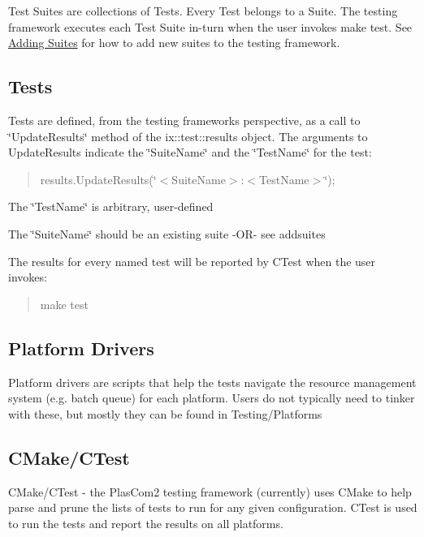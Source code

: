 Test Suites are collections of Tests. Every Test belongs to a Suite. The testing framework executes each Test Suite in-\/turn when the user invokes \textquotesingle{}make test\textquotesingle{}. See \hyperlink{testing_reference_addsuite}{Adding Suites} for how to add new suites to the testing framework.\hypertarget{testing_reference_tests}{}\subsection{Tests}\label{testing_reference_tests}
Tests are defined, from the testing framework\textquotesingle{}s perspective, as a call to \char`\"{}\+Update\+Results\char`\"{} method of the ix\+::test\+::results object. The arguments to Update\+Results indicate the \char`\"{}\+Suite\+Name\char`\"{} and the \char`\"{}\+Test\+Name\char`\"{} for the test\+:

\begin{quote}
results.\+Update\+Results(\char`\"{}$<$\+Suite\+Name$>$\+:$<$\+Test\+Name$>$\char`\"{}); \end{quote}



\begin{DoxyItemize}
\item The \char`\"{}\+Test\+Name\char`\"{} is arbitrary, user-\/defined
\item The \char`\"{}\+Suite\+Name\char`\"{} should be an existing suite -\/\+O\+R-\/ see addsuites
\end{DoxyItemize}

The results for every named test will be reported by C\+Test when the user invokes\+: \begin{quote}
make test \end{quote}
\hypertarget{testing_reference_platforms}{}\subsection{Platform Drivers}\label{testing_reference_platforms}
Platform drivers are scripts that help the tests navigate the resource management system (e.\+g. batch queue) for each platform. Users do not typically need to tinker with these, but mostly they can be found in Testing/\+Platforms\hypertarget{testing_reference_cmake}{}\subsection{C\+Make/\+C\+Test}\label{testing_reference_cmake}
C\+Make/\+C\+Test -\/ the Plas\+Com2 testing framework (currently) uses C\+Make to help parse and prune the lists of tests to run for any given configuration. C\+Test is used to run the tests and report the results on all platforms. 